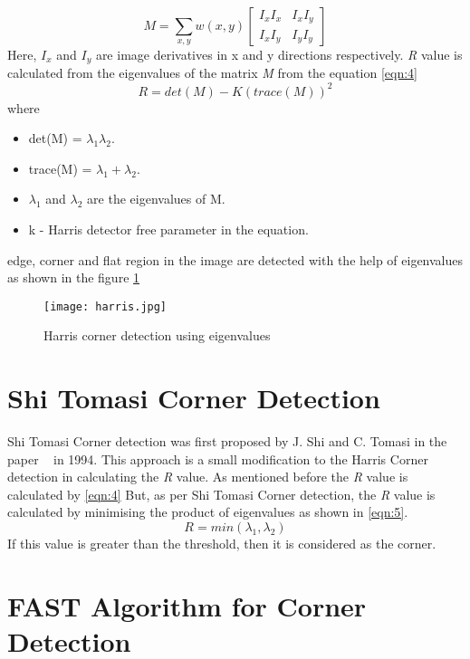 \begin{equation}\label{eqn:3}
	M = \sum_{x,y} w(x, y)
    	\begin{bmatrix}
		I_{x}I_{x} & I_{x}I_{y}
		\\
		I_{x}I_{y} & I_{y}I_{y}
	\end{bmatrix}
\end{equation}
Here, $I_{x}$ and $I_{y}$ are image derivatives in x and y directions respectively.
\textit{R} value is calculated from the eigenvalues of the matrix \textit{M} from the equation \ref{eqn:4}
 \begin{equation}\label{eqn:4}
	R = det(M) - K (trace(M))^{2}
\end{equation}
where
\begin{itemize}
	\item det(M) = $\lambda_{1} \lambda_{2}$.
	\item trace(M) = $\lambda_{1} + \lambda_{2}$.
	\item $\lambda_{1}$ and $\lambda_{2}$ are the eigenvalues of M.
	\item k - Harris detector free parameter in the equation.
\end{itemize}
edge, corner and flat region in the image are detected with the help of eigenvalues as shown in the figure \ref{fig:harris}

\begin{figure}[tb]
	\center\texttt{[image: harris.jpg]}
	\caption{Harris corner detection using eigenvalues}
	\label{fig:harris}
\end{figure}
\section{Shi Tomasi Corner Detection}
Shi Tomasi Corner detection was first proposed by J. Shi and C. Tomasi in the paper ~\cite{shi1994good} in 1994. This approach is a small modification to the Harris Corner detection in calculating the \textit{R} value. As mentioned before the \textit{R} value is calculated by \ref{eqn:4}
But, as per Shi Tomasi Corner detection, the \textit{R} value is calculated by minimising the product of eigenvalues as shown in \ref{eqn:5}.
 \begin{equation}\label{eqn:5}
	R = min(\lambda_{1}, \lambda_{2})
\end{equation}
If this value is greater than the threshold, then it is considered as the corner.
\section{FAST Algorithm for Corner Detection}




